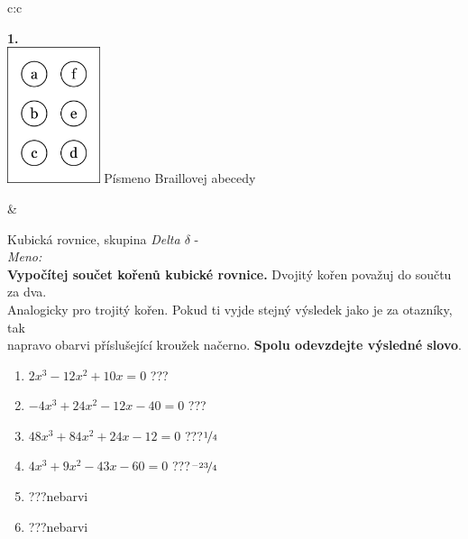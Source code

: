 \documentclass[10pt]{report}
\begin{document}
\begin{tabular}{c:c}
\begin{minipage}[c][99mm][t]{0.49\linewidth}
\begin{center}
\begin{minipage}{0.20\linewidth}
\begin{center}
{\Huge\bfseries 1.} \\[2mm]
\includegraphics[height=40mm]{../images/braille.png}
{\small Písmeno Braillovej abecedy}
\end{center}
\end{minipage}
\end{center}
\end{minipage}
&
\begin{minipage}[c][99mm][t]{0.49\linewidth}
\begin{center}
\vspace{7mm}
{\huge Kubická rovnice, skupina \textit{Delta $\delta$} -}\\[4.5mm]
\textit{Meno:}\phantom{xxxxxxxxxxxxxxxxxxxxxxxxxxxxxxxxxxxxxxxxxxxxxxxxxxxxxxxxxxxxxxxxx}\\[3.5mm]
\textbf{Vypočítej součet kořenů kubické rovnice.} Dvojitý kořen považuj do součtu za dva.\\Analogicky pro trojitý kořen. Pokud ti vyjde stejný výsledek jako je za otazníky, tak\\napravo obarvi příslušející kroužek načerno. \textbf{Spolu odevzdejte výsledné slovo}.\\[3mm]
\begin{minipage}{0.77\linewidth}
\begin{center}
\begin{varwidth}{\textwidth}
\begin{enumerate}
\large
\item $2x^3-12x^2+10x=0$\quad \dotfill\; ???\;\dotfill {}
\item $-4x^3+24x^2-12x-40=0$\quad \dotfill\; ???\;\dotfill {}
\item $48x^3+84x^2+24x-12=0$\quad \dotfill\; ???\;\dotfill \quad $\nicefrac{1}{4}$
\item $4x^3+9x^2-43x-60=0$\quad \dotfill\; ???\;\dotfill \quad $\nicefrac{-23}{4}$
\item \quad \dotfill\; ???\;\dotfill \quad nebarvi
\item \quad \dotfill\; ???\;\dotfill \quad nebarvi
\end{enumerate}

\end{varwidth}
\end{center}
\end{minipage}
\end{center}
\end{minipage}
\end{tabular}
\end{document}
